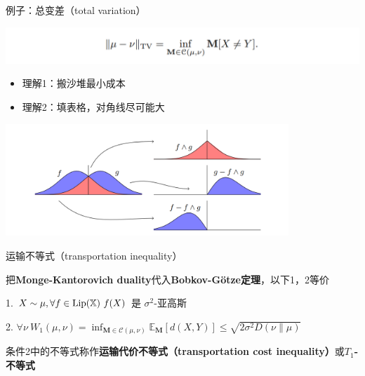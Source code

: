 \documentclass{beamer}
\begin{document}
\begin{frame}{例子：总变差（total variation）}

\begin{center}
\includegraphics[width=1.0\textwidth, frame]{figures/4-14-eg.png}
\end{center}

\begin{itemize}
    \item 理解1：搬沙堆最小成本
    \item 理解2：填表格，对角线尽可能大
\end{itemize}

\begin{center}
\includegraphics[width=0.8\textwidth, frame]{figures/4-14-fig.png}
\end{center}

\end{frame}

\begin{frame}{运输不等式（transportation inequality）}

把\textbf{Monge-Kantorovich duality}代入\textbf{Bobkov-G{\"o}tze定理}，以下1，2等价

1. $X\sim\mu, \forall f\in{\rm Lip}(\mathbb{X})\ f(X)$ 是 $\sigma^2$-亚高斯

2. $\forall \nu\ W_1(\mu, \nu) = \inf_{\mathbf{M} \in \mathcal{C}(\mu,\nu)} \mathbb{E}_{\mathbf{M}} [d(X, Y)] \le \sqrt{2\sigma^{2}D(\nu\|\mu)}$

条件2中的不等式称作\textbf{运输代价不等式（transportation cost inequality）}或\textbf{$T_1$-不等式}

\end{frame}
\end{document}
